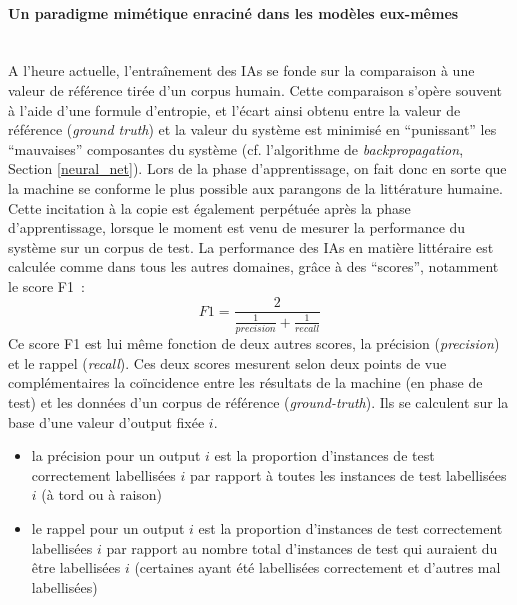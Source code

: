 \documentclass{article}
\newcommand{\subsubsubsection}[1]{\paragraph{#1}\mbox{}\\}
\begin{document}
				\subsubsubsection{Un paradigme mimétique enraciné dans les modèles eux-mêmes}
					
					A l'heure actuelle, l'entraînement des IAs se fonde sur la comparaison à une valeur de référence tirée d'un corpus humain. Cette comparaison s'opère souvent à l'aide d'une formule d'entropie, et l'écart ainsi obtenu entre la valeur de référence (\textit{ground truth}) et la valeur du système est minimisé en ``punissant'' les ``mauvaises'' composantes du système (cf. l'algorithme de \textit{backpropagation}, Section \ref{neural_net}). Lors de la phase d'apprentissage, on fait donc en sorte que la machine se conforme le plus possible aux parangons de la littérature humaine.\\
				
					Cette incitation à la copie est également perpétuée après la phase d'apprentissage, lorsque le moment est venu de mesurer la performance du système sur un corpus de test. La performance des IAs en matière littéraire est calculée comme dans tous les autres domaines, grâce à des ``scores'', notamment le score F1~:
					\begin{equation}
						F1 = \frac{2}{\frac{1}{precision}+\frac{1}{recall}}
					\end{equation}
					Ce score F1 est lui même fonction de deux autres scores, la précision (\textit{precision}) et le rappel (\textit{recall}). Ces deux scores mesurent selon deux points de vue complémentaires la coïncidence entre les résultats de la machine (en phase de test) et les données d'un corpus de référence (\textit{ground-truth}). Ils se calculent sur la base d'une valeur d'output fixée $i$. 
					\vspace{2mm}
					\begin{itemize}
						\item la précision pour un output $i$ est la proportion d'instances de test correctement labellisées $i$ par rapport à toutes les instances de test labellisées $i$ (à tord ou à raison)
						\item le rappel pour un output $i$ est la proportion d'instances de test correctement labellisées $i$ par rapport au nombre total d'instances de test qui auraient du être labellisées $i$ (certaines ayant été labellisées correctement et d'autres mal labellisées)
					\end{itemize}
					\vspace{2mm}
\end{document}
